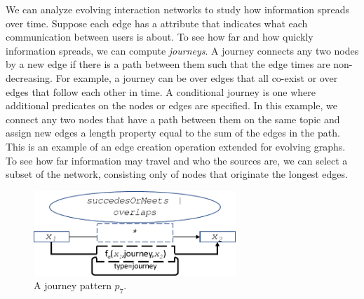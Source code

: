 We can analyze evolving interaction networks to study how information
spreads over time.  Suppose each edge has a  attribute
that indicates what each communication between users is about.  To see
how far and how quickly information spreads, we can compute {\em
journeys}.  A journey connects any two nodes by a new edge if there is
a path between them such that the edge times are non-decreasing.  For
example, a journey can be over edges that all co-exist or over edges
that follow each other in time.  A conditional journey is one where
additional predicates on the nodes or edges are specified.  In this
example, we connect any two nodes that have a path between them on the
same topic and assign new edges a length property equal to the sum of
the edges in the path.  This is an example of an edge creation
operation extended for evolving graphs.  To see how far information
may travel and who the sources are, we can select a subset of the
network, consisting only of nodes that originate the longest edges.

\begin{figure}
\centering
\includegraphics[width=3in]{figs/journeys.pdf}
\caption{A journey pattern $p_7$.}
\vspace{-0.2cm}
\label{fig:journeysp}
\vspace{-0.2cm}
\end{figure}

